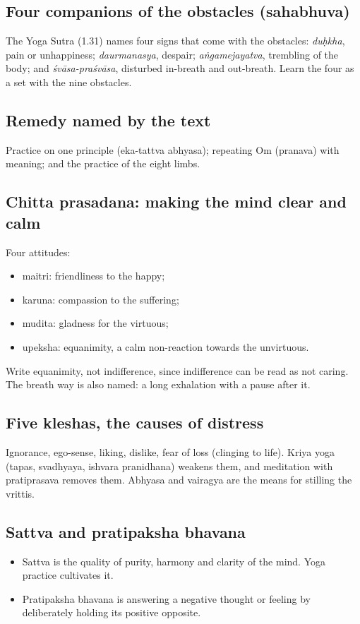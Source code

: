 \subsection*{Four companions of the obstacles (sahabhuva)}
The Yoga Sutra (1.31) names four signs that come with the obstacles: \emph{duḥkha}, pain or unhappiness; \emph{daurmanasya}, despair; \emph{aṅgamejayatva}, trembling of the body; and \emph{śvāsa-praśvāsa}, disturbed in-breath and out-breath. Learn the four as a set with the nine obstacles.

\subsection*{Remedy named by the text}
Practice on one principle (eka-tattva abhyasa); repeating Om (pranava) with meaning; and the practice of the eight limbs.

\subsection*{Chitta prasadana: making the mind clear and calm}
Four attitudes:
\begin{itemize}
\item maitri: friendliness to the happy;
\item karuna: compassion to the suffering;
\item mudita: gladness for the virtuous;
\item upeksha: equanimity, a calm non-reaction towards the unvirtuous.
\end{itemize}
Write equanimity, not indifference, since indifference can be read as not caring. The breath way is also named: a long exhalation with a pause after it.

\subsection*{Five kleshas, the causes of distress}
Ignorance, ego-sense, liking, dislike, fear of loss (clinging to life). Kriya yoga (tapas, svadhyaya, ishvara pranidhana) weakens them, and meditation with pratiprasava removes them. Abhyasa and vairagya are the means for stilling the vrittis.

\subsection*{Sattva and pratipaksha bhavana}
\begin{itemize}
\item Sattva is the quality of purity, harmony and clarity of the mind. Yoga practice cultivates it.
\item Pratipaksha bhavana is answering a negative thought or feeling by deliberately holding its positive opposite.
\end{itemize}

